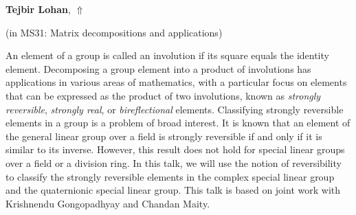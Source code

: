 \documentclass[ILAS2025-program.tex]{subfiles}
\begin{document}
\hypertarget{down0309}{}\begin{ilasabstract}
    
\textbf{Tejbir Lohan},  \hfill \hyperlink{up0309}{$\Uparrow$}
    
    
(in {\color{mstitle}MS31: Matrix decompositions and applications})
        
\mtskip
    An element of a group is called an involution if its square equals the identity element. Decomposing a group element into a product of involutions has applications in various areas of mathematics, with a particular focus on elements that can be expressed as the product of two involutions, known as \textit{strongly reversible}, \textit{strongly real}, or \textit{bireflectional} elements. Classifying strongly reversible elements in a group is a problem of broad interest. It is known that an element of the general linear group over a field is strongly reversible if and only if it is similar to its inverse. However, this result does not hold for special linear groups over a field or a division ring. In this talk, we will use the notion of reversibility to classify the strongly reversible elements in the complex special linear group and the quaternionic special linear group. This talk is based on joint work with Krishnendu Gongopadhyay and Chandan Maity.

\end{ilasabstract}
    
\end{document}
